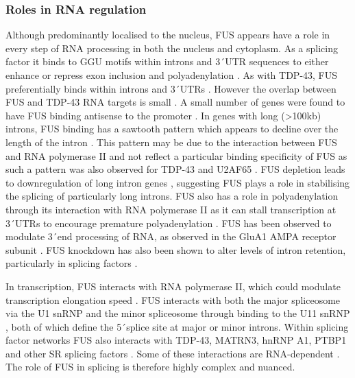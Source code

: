 \subsubsection{Roles in RNA regulation}

Although predominantly localised to the nucleus, FUS appears have a role in every step of RNA processing in both the nucleus and cytoplasm. 
As a splicing factor it binds to GGU motifs within introns and 3\'\ UTR sequences to either enhance or repress exon inclusion and polyadenylation \citep{Rogelj2012,Lagier-Tourenne2012}.
As with TDP-43, FUS preferentially binds within introns and 3\'\ UTRs \citep{Lagier-Tourenne2012,Rogelj2012,Ishigaki2012}. 
However the overlap between FUS and TDP-43 RNA targets is small  \citep{Lagier-Tourenne2012,Rogelj2012,Colombrita2012, Honda2014}.
A small number of genes were found to have FUS binding antisense to the promoter \citep{Ishigaki2012}.
In genes with long (>100kb) introns, FUS binding has a sawtooth pattern which appears to decline over the length of the intron \citep{Rogelj2012,Lagier-Tourenne2012}.  
This pattern may be due to the interaction between FUS and RNA polymerase II \citep{Schwartz2012} and not reflect a particular binding specificity of FUS as such a pattern was also observed for TDP-43 and U2AF65 \citep{Rogelj2012}.
FUS depletion leads to downregulation of long intron genes \citep{Lagier-Tourenne2012}, suggesting FUS plays a role in stabilising the splicing of particularly long introns.
FUS also has a role in polyadenylation through its interaction with RNA polymerase II \citep{Schwartz2012} as it can stall transcription at 3\'\ UTRs to encourage premature polyadenylation \citep{Masuda2015}. 
FUS has been observed to modulate 3\'\ end processing of RNA, as observed in the GluA1 AMPA receptor subunit \citep{Udagawa2015}. %
FUS knockdown has also been shown to alter levels of intron retention, particularly in splicing factors \citep{VanBlitterswijk2013, Nakaya2013}.

In transcription, FUS interacts with RNA polymerase II, which could modulate transcription elongation speed \citep{Schwartz2012}.
FUS interacts with both the major spliceosome via the U1 snRNP \citep{Sun2015a, Yu2015a} and the minor spliceosome through binding to  the U11 snRNP \citep{Reber2016}, both of which define the 5\'\ splice site at major or minor introns.
Within splicing factor networks FUS also interacts with TDP-43, MATRN3, hnRNP A1, PTBP1 and other SR splicing factors \citep{Lagier-Tourenne2012,Yamaguchi2016,Yang1998,Meissner2003, Kamelgarn2016}. 
Some of these interactions are RNA-dependent \citep{Kamelgarn2016}.
The role of FUS in splicing is therefore highly complex and nuanced.

